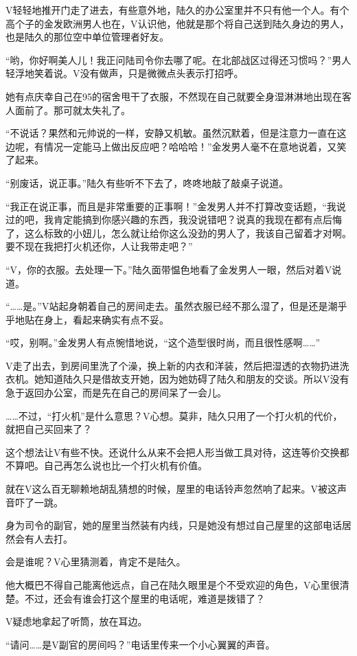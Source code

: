 V轻轻地推开门走了进去，有些意外地，陆久的办公室里并不只有他一个人。有个高个子的金发欧洲男人也在，V认识他，他就是那个将自己送到陆久身边的男人，也是陆久的那位空中单位管理者好友。

“哟，你好啊美人儿！我正问陆司令你去哪了呢。在北部战区过得还习惯吗？”男人轻浮地笑着说。V没有做声，只是微微点头表示打招呼。

她有点庆幸自己在95的宿舍甩干了衣服，不然现在自己就要全身湿淋淋地出现在客人面前了。那可就太失礼了。

“不说话？果然和元帅说的一样，安静又机敏。虽然沉默着，但是注意力一直在这边呢，有情况一定能马上做出反应吧？哈哈哈！”金发男人毫不在意地说着，又笑了起来。

“别废话，说正事。”陆久有些听不下去了，咚咚地敲了敲桌子说道。

“我正在说正事，而且是非常重要的正事啊！”金发男人并不打算改变话题，“我说过的吧，我肯定能搞到你感兴趣的东西，我没说错吧？说真的我现在都有点后悔了，这么标致的小妞儿，怎么就让给你这么没劲的男人了，我该自己留着才对啊。要不现在我把打火机还你，人让我带走吧？”

“V，你的衣服。去处理一下。”陆久面带愠色地看了金发男人一眼，然后对着V说道。

“……是。”V站起身朝着自己的房间走去。虽然衣服已经不那么湿了，但是还是潮乎乎地贴在身上，看起来确实有点不妥。

“哎，别啊。”金发男人有点惋惜地说，“这个造型很时尚，而且很性感啊……”

V走了出去，到房间里洗了个澡，换上新的内衣和洋装，然后把湿透的衣物扔进洗衣机。她知道陆久只是借故支开她，因为她妨碍了陆久和朋友的交谈。所以V没有急于返回办公室，而是先在自己的房间呆了一会儿。

……不过，“打火机”是什么意思？V心想。莫非，陆久只用了一个打火机的代价，就把自己买回来了？

这个想法让V有些不快。还说什么从来不会把人形当做工具对待，这连等价交换都不算吧。自己再怎么说也比一个打火机有价值。

就在V这么百无聊赖地胡乱猜想的时候，屋里的电话铃声忽然响了起来。V被这声音吓了一跳。

身为司令的副官，她的屋里当然装有内线，只是她没有想过自己屋里的这部电话居然会有人去打。

会是谁呢？V心里猜测着，肯定不是陆久。

他大概巴不得自己能离他远点，自己在陆久眼里是个不受欢迎的角色，V心里很清楚。不过，还会有谁会打这个屋里的电话呢，难道是拨错了？

V疑虑地拿起了听筒，放在耳边。

“请问……是V副官的房间吗？”电话里传来一个小心翼翼的声音。


